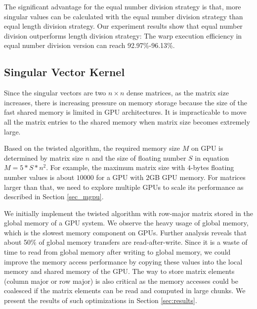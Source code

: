 %

The significant advantage for the equal number division strategy is that, more singular values can be calculated with the equal number division strategy than equal length division strategy.
Our experiment results show that equal number division outperforms length division strategy:
The warp execution efficiency in equal number division version can reach 92.97\%-96.13\%.

\vspace{-0.15in}
\subsection{Singular Vector Kernel} \label{sec_svector}
\vspace{-0.1in}
Since the singular vectors are two $n\times n$ dense matrices, as the matrix size increases, there is increasing pressure on memory storage because the size of the fast shared memory is limited in GPU architectures.
It is impracticable to move all the matrix entries to the shared memory when matrix size becomes extremely large.

Based on the twisted algorithm, the required memory size $M$ on GPU is determined by matrix size $n$ and the size of floating number $S$ in equation $M = 5 * S * n^2$.
For example, the maximum matrix size with $4$-bytes floating number values is about $10000$ for a GPU with $2$GB GPU memory. 
For matrices larger than that, we need to explore multiple GPUs to scale its performance as described in Section \ref{sec_mgpu}.

We initially implement the twisted algorithm with row-major matrix stored in the global memory
of a GPU system. 
We observe the heavy usage of global memory, which is
the slowest memory component on GPUs. 
Further analysis reveals that about 50\% of global memory transfers are read-after-write. Since it is a waste of time to read from global memory after writing to global memory,
we could improve the memory access performance by copying these values into the local memory and shared memory of the GPU.
The way to store matrix elements (column major or row major) is also critical as the memory accesses could be coalesced if the matrix elements
can be read and computed in large chunks. We present the results
of such optimizations in Section \ref{sec:results}.

